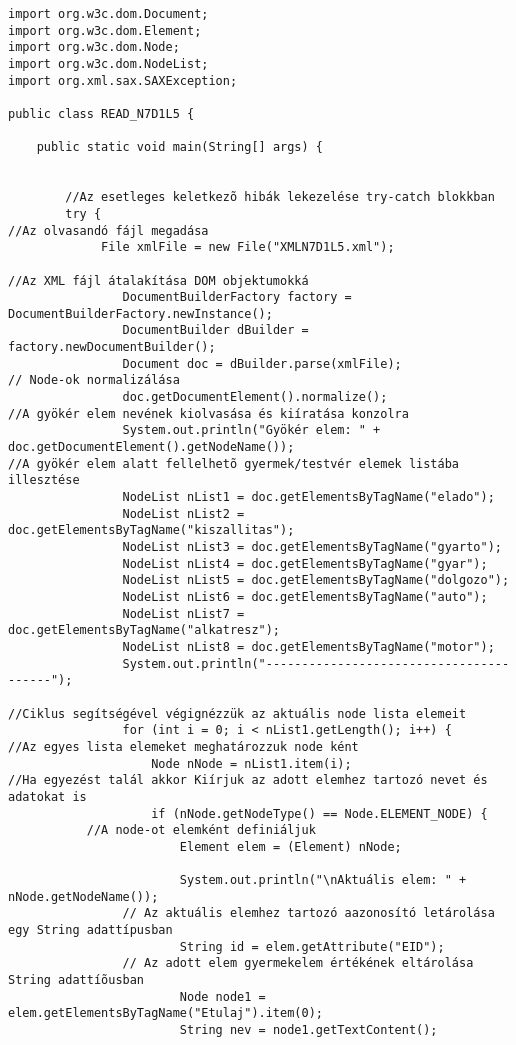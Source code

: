 \documentclass[14pt]{extarticle}
\begin{document}
\begin{normalsize}
\begin{verbatim}
import org.w3c.dom.Document;
import org.w3c.dom.Element;
import org.w3c.dom.Node;
import org.w3c.dom.NodeList;
import org.xml.sax.SAXException;

public class READ_N7D1L5 {

	public static void main(String[] args) {
		
		
		//Az esetleges keletkezõ hibák lekezelése try-catch blokkban
		try {
//Az olvasandó fájl megadása
			 File xmlFile = new File("XMLN7D1L5.xml");
			 
//Az XML fájl átalakítása DOM objektumokká
		        DocumentBuilderFactory factory = DocumentBuilderFactory.newInstance();
		        DocumentBuilder dBuilder = factory.newDocumentBuilder();
		        Document doc = dBuilder.parse(xmlFile);
// Node-ok normalizálása
		        doc.getDocumentElement().normalize();
//A gyökér elem nevének kiolvasása és kiíratása konzolra		        
		        System.out.println("Gyökér elem: " + doc.getDocumentElement().getNodeName());
//A gyökér elem alatt fellelhetõ gyermek/testvér elemek listába illesztése
		        NodeList nList1 = doc.getElementsByTagName("elado");
		        NodeList nList2 = doc.getElementsByTagName("kiszallitas");
		        NodeList nList3 = doc.getElementsByTagName("gyarto");
		        NodeList nList4 = doc.getElementsByTagName("gyar");
		        NodeList nList5 = doc.getElementsByTagName("dolgozo");
		        NodeList nList6 = doc.getElementsByTagName("auto");
		        NodeList nList7 = doc.getElementsByTagName("alkatresz");
		        NodeList nList8 = doc.getElementsByTagName("motor");
		        System.out.println("----------------------------------------");

//Ciklus segítségével végignézzük az aktuális node lista elemeit
		        for (int i = 0; i < nList1.getLength(); i++) {
//Az egyes lista elemeket meghatározzuk node ként
		            Node nNode = nList1.item(i);
//Ha egyezést talál akkor Kiírjuk az adott elemhez tartozó nevet és adatokat is
		            if (nNode.getNodeType() == Node.ELEMENT_NODE) {
		   //A node-ot elemként definiáljuk
		            	Element elem = (Element) nNode;

		                System.out.println("\nAktuális elem: " + nNode.getNodeName());
		        // Az aktuális elemhez tartozó aazonosító letárolása egy String adattípusban
		                String id = elem.getAttribute("EID");
		        // Az adott elem gyermekelem értékének eltárolása String adattíõusban
		                Node node1 = elem.getElementsByTagName("Etulaj").item(0);
		                String nev = node1.getTextContent();
		                

\end{verbatim}
\end{normalsize}
\end{document}
